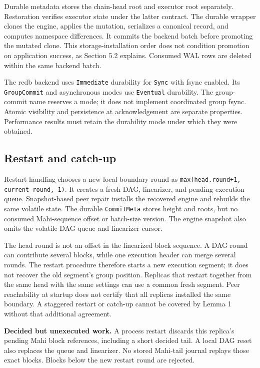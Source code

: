 \documentclass[11pt]{article}
\begin{document}
Durable metadata stores the chain-head root and executor root separately. Restoration verifies executor state under the latter contract. The durable wrapper clones the engine, applies the mutation, serializes a canonical record, and computes namespace differences. It commits the backend batch before promoting the mutated clone. This storage-installation order does not condition promotion on application success, as Section 5.2 explains. Consumed WAL rows are deleted within the same backend batch. \cite{R12}

The redb backend uses \texttt{Immediate} durability for \texttt{Sync} with fsync enabled. Its \texttt{GroupCommit} and asynchronous modes use \texttt{Eventual} durability. The group-commit name reserves a mode; it does not implement coordinated group fsync. Atomic visibility and persistence at acknowledgement are separate properties. Performance results must retain the durability mode under which they were obtained. \cite{R12}

\subsection{Restart and catch-up}
Restart handling chooses a new local boundary round as \texttt{max(head.round+1, current\_\allowbreak round, 1)}. It creates a fresh DAG, linearizer, and pending-execution queue. Snapshot-based peer repair installs the recovered engine and rebuilds the same volatile state. The durable \texttt{CommitMeta} stores height and roots, but no consumed Mahi-sequence offset or batch-size version. The engine snapshot also omits the volatile DAG queue and linearizer cursor. \cite{R12}

The head round is not an offset in the linearized block sequence. A DAG round can contribute several blocks, while one execution header can merge several rounds. The restart procedure therefore starts a new execution segment; it does not recover the old segment's group position. Replicas that restart together from the same head with the same settings can use a common fresh segment. Peer reachability at startup does not certify that all replicas installed the same boundary. A staggered restart or catch-up cannot be covered by Lemma 1 without that additional agreement.

\textbf{Decided but unexecuted work.} A process restart discards this replica's pending Mahi block references, including a short decided tail. A local DAG reset also replaces the queue and linearizer. No stored Mahi-tail journal replays those exact blocks. Blocks below the new restart round are rejected. \cite{R12}
\end{document}
